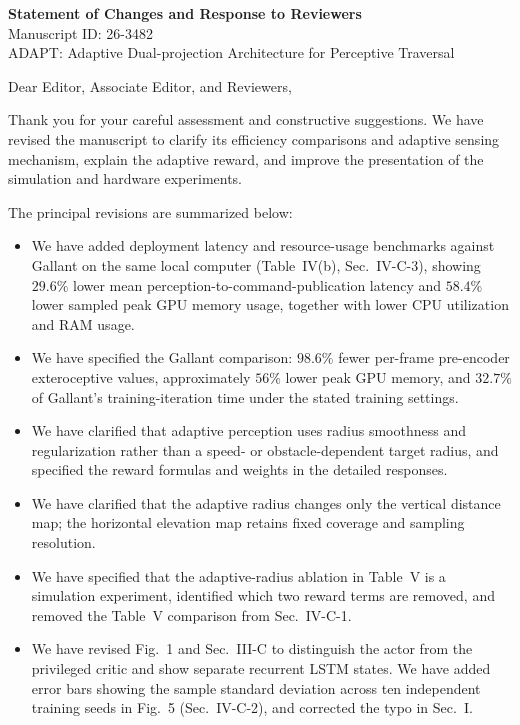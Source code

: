 \documentclass[11pt]{article}
\begin{document}
\begin{center}
{\LARGE\bfseries Statement of Changes and Response to Reviewers}\\[0.8em]
{\large Manuscript ID: 26-3482}\\[0.35em]
{\large ADAPT: Adaptive Dual-projection Architecture for Perceptive Traversal}
\end{center}
\vspace{0.8em}
Dear Editor, Associate Editor, and Reviewers,

Thank you for your careful assessment and constructive suggestions. We have revised the manuscript to clarify its efficiency comparisons and adaptive sensing mechanism, explain the adaptive reward, and improve the presentation of the simulation and hardware experiments.

The principal revisions are summarized below:
\begin{itemize}
    \item We have added deployment latency and resource-usage benchmarks against Gallant on the same local computer (Table~IV(b), Sec.~IV-C-3), showing $29.6\%$ lower mean perception-to-command-publication latency and $58.4\%$ lower sampled peak GPU memory usage, together with lower CPU utilization and RAM usage.
    \item We have specified the Gallant comparison: $98.6\%$ fewer per-frame pre-encoder exteroceptive values, approximately $56\%$ lower peak GPU memory, and $32.7\%$ of Gallant's training-iteration time under the stated training settings.
    \item We have clarified that adaptive perception uses radius smoothness and regularization rather than a speed- or obstacle-dependent target radius, and specified the reward formulas and weights in the detailed responses.
    \item We have clarified that the adaptive radius changes only the vertical distance map; the horizontal elevation map retains fixed coverage and sampling resolution.
    \item We have specified that the adaptive-radius ablation in Table~V is a simulation experiment, identified which two reward terms are removed, and removed the Table~V comparison from Sec.~IV-C-1.
    \item We have revised Fig.~1 and Sec.~III-C to distinguish the actor from the privileged critic and show separate recurrent LSTM states. We have added error bars showing the sample standard deviation across ten independent training seeds in Fig.~5 (Sec.~IV-C-2), and corrected the typo in Sec.~I.
\end{itemize}
\end{document}
